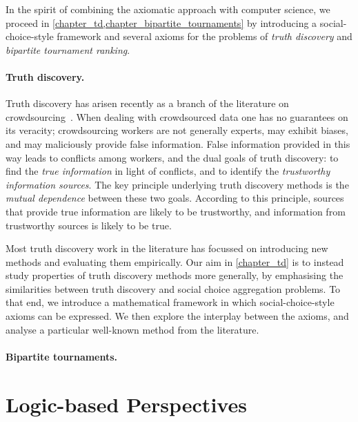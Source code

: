 In the spirit of combining the axiomatic approach with computer science, we
proceed in \cref{chapter_td,chapter_bipartite_tournaments} by introducing a
social-choice-style framework and several axioms for the problems of
\emph{truth discovery} and \emph{bipartite tournament ranking}.

\paragraph{Truth discovery.}

Truth discovery has arisen recently as a branch of the literature on
crowdsourcing~\cite{li_survey_2016}. When dealing with crowdsourced data one
has no guarantees on its veracity; crowdsourcing workers are not generally
experts, may exhibit biases, and may maliciously provide false information.
False information provided in this way leads to conflicts among workers, and
the dual goals of truth discovery: to find the \emph{true information} in light
of conflicts, and to identify the \emph{trustworthy information sources}. The
key principle underlying truth discovery methods is the \emph{mutual
dependence} between these two goals. According to this principle, sources that
provide true information are likely to be trustworthy, and information from
trustworthy sources is likely to be true.

Most truth discovery work in the literature has focussed on introducing new
methods and evaluating them empirically.\footnotemark{} Our aim in
\cref{chapter_td} is to instead study properties of truth discovery methods
more generally, by emphasising the similarities between truth discovery and
social choice aggregation problems. To that end, we introduce a mathematical
framework in which social-choice-style axioms can be expressed. We then explore
the interplay between the axioms, and analyse a particular well-known method
from the literature.


\paragraph{Bipartite tournaments.}


\section{Logic-based Perspectives}
\label{intro_sec_logic_based_perspectives}

